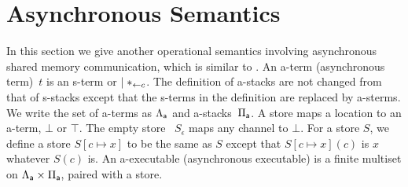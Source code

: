 \documentclass[envcountsame]{llncs}
\begin{document}

\section{Asynchronous Semantics}
\label{sec:async}

In this section we give another operational semantics involving
asynchronous shared memory communication, which is similar to \citet{hiraiflops2012}.
An a-term (asynchronous term)~$t$ is an s-term or
$\mid \ast_{\leftarrow{c}}$.
The definition of a-stacks are not changed from that of s-stacks except
that the s-terms in the definition are replaced by a-sterms.
We write the set of a-terms as $\Lambda_{\mathsf a}$ and a-stacks~$\Pi_{\mathsf a}$.
A store maps a location to an a-term, $\bot$ or $\top$.
The empty store%
~$S_\epsilon$ maps any channel to $\bot$.
For a store $S$, we define a store $S[c\mapsto x]$ to be
the same as $S$ except that $S[c\mapsto x](c)$ is $x$ whatever $S(c)$ is.
An a-executable (asynchronous executable)
is a finite multiset on $\Lambda_{\mathsf a} \times \Pi_{\mathsf a}$,
paired with a store.
\end{document}

